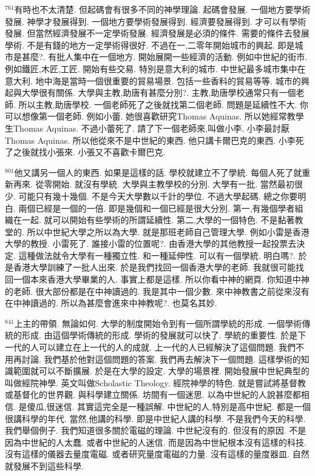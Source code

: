 \documentclass{book}
\begin{document}
$^{761}$有時也不太清楚.
但起碼會有很多不同的神學理論.
起碼會發展.
一個地方要學術發展.
神學才發展得到.
一個地方要學術發展得到.
經濟要發展得到.
才可以有學術發展.
但當然經濟發展不一定學術發展.
經濟發展是必須的條件.
需要的條件去發展學術.
不是有錢的地方一定學術得很好.
不過在一,二零年開始城市的興起.
即是城市是甚麼?.
有批人集中在一個地方.
開始展開一些經濟的活動.
例如中世紀的街市.
例如鐵匠,木匠,工匠.
開始有些交易.
特別是意大利的城市.
中世紀最多城市集中在意大利.
地中海是當時一個很重要的貿易場景.
包括一些香料的貿易等等.
城市的興起與大學很有關係.
大學與主教,助唐有甚麼分別?.
主教,助唐學校通常只有一個老師.
所以主教,助唐學校.
一個老師死了之後就找第二個老師.
問題是延續性不大.
你可以想像第一個老師.
例如小蕾.
她很喜歡研究Thomas Aquinas.
所以她經常教學生Thomas Aquinas.
不過小蕾死了.
請了下一個老師來,叫做小李.
小李最討厭Thomas Aquinas.
所以他從來不是中世紀的東西.
他只講卡爾巴克的東西.
小李死了之後就找小張來.
小張又不喜歡卡爾巴克.

$^{801}$他又講另一個人的東西.
如果是這樣的話.
學校就建立不了學統.
每個人死了就重新再來.
從零開始.
就沒有學統.
大學與主教學校的分別.
大學有一批.
當然最初很少.
可能只有幾十幾個.
不是今天大學數以千計的學位.
不過大學起碼.
總之你要明白.
兩個已經是一個的一倍.
即是幾個和一個已經是很大分別.
第一,有幾個學者組織在一起.
就可以開始有些學術的所謂延續性.
第二,大學的一個特色.
不是黏著教堂的.
所以中世紀大學之所以為大學.
就是那班老師自己管理大學.
例如小雷是香港大學的教授.
小雷死了.
誰接小雷的位置呢?.
由香港大學的其他教授一起投票去決定.
這種做法就令大學有一種獨立性.
和一種延伸性.
可以有一個學統.
明白嗎?.
於是香港大學訓練了一批人出來.
於是我們找回一個香港大學的老師.
我就很可能找回一個本來香港大學畢業的人.
事實上都是這樣.
所以你看中神的網頁.
你知道中神的老師.
很大部份都是在中神讀過的.
我是其中一個少數.
來中神教書之前從來沒有在中神讀過的.
所以為甚麼會進來中神教呢?.
也莫名其妙.

$^{841}$上主的帶領.
無論如何.
大學的制度開始令到有一個所謂學統的形成.
一個學術傳統的形成.
由這個學術傳統的形成.
學術的發展就可以快了.
學統的重要性.
於是下一代的人可以建立在上一代的人的成就.
上一代的人已經解決了這個問題.
我們不用再討論.
我們基於他對這個問題的答案.
我們再去解決下一個問題.
這樣學術的知識範圍就可以不斷擴展.
於是在大學的設定.
大學的場景裡.
開始發展中世紀典型的叫做經院神學.
英文叫做Scholastic Theology.
經院神學的特色.
就是嘗試將基督教或基督化的世界觀.
與科學建立關係.
坊間有一個迷思.
以為中世紀的人說甚麼都相信.
是傻瓜,很迷信.
其實這完全是一種誤解.
中世紀的人,特別是高中世紀.
都是一個很講科學的年代.
當然,他講的科學.
即是中世紀人講的科學.
不是我們今天的科學.
我們舉個例子.
我們知道很多關於電磁的理論.
中世紀沒有的.
但沒有的原因.
不是因為中世紀的人太蠢.
或者中世紀的人迷信.
而是因為中世紀根本沒有這樣的科技.
沒有這樣的儀器去量度電磁.
或者研究量度電磁的力量.
沒有這樣的量度器皿.
自然就發展不到這些科學.
\end{document}
